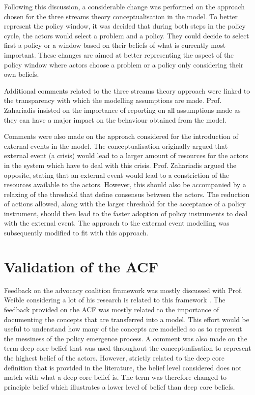 Following this discussion, a considerable change was performed on the approach chosen for the three streams theory conceptualisation in the model. To better represent the policy window, it was decided that during both steps in the policy cycle, the actors would select a problem and a policy. They could decide to select first a policy or a window based on their beliefs of what is currently most important. These changes are aimed at better representing the aspect of the policy window where actors choose a problem or a policy only considering their own beliefs.
 
Additional comments related to the three streams theory approach were linked to the transparency with which the modelling assumptions are made. Prof. Zahariadis insisted on the importance of reporting on all assumptions made as they can have a major impact on the behaviour obtained from the model.
 
Comments were also made on the approach considered for the introduction of external events in the model. The conceptualisation originally argued that external event (a crisis) would lead to a larger amount of resources for the actors in the system which have to deal with this crisis. Prof. Zahariadis argued the opposite, stating that an external event would lead to a constriction of the resources available to the actors. However, this should also be accompanied by a relaxing of the threshold that define consensus between the actors. The reduction of actions allowed, along with the larger threshold for the acceptance of a policy instrument, should then lead to the faster adoption of policy instruments to deal with the external event. The approach to the external event modelling was subsequently modified to fit with this approach.
 
%
\section{Validation of the ACF}
\label{sec:validationACF}
 
Feedback on the advocacy coalition framework was mostly discussed with Prof. Weible considering a lot of his research is related to this framework \citep{weible2009themes, sabatier2014theories, nohrstedt2010logic, jenkins2014advocacy}. The feedback provided on the ACF was mostly related to the importance of documenting the concepts that are transferred into a model. This effort would be useful to understand how many of the concepts are modelled so as to represent the messiness of the policy emergence process. A comment was also made on the term deep core belief that was used throughout the conceptualisation to represent the highest belief of the actors. However, strictly related to the deep core definition that is provided in the literature, the belief level considered does not match with what a deep core belief is. The term was therefore changed to principle belief which illustrates a lower level of belief than deep core beliefs. 
